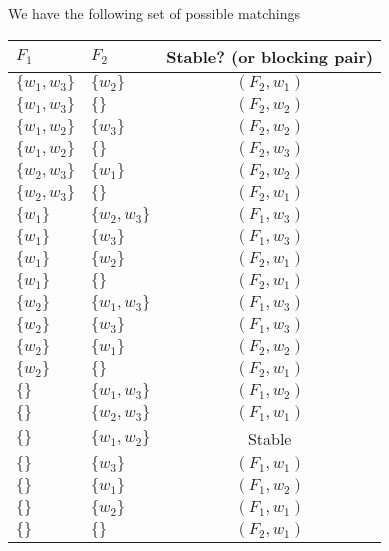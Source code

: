 \documentclass[12pt]{article}
\begin{document}
We have the following set of possible matchings
\begin{center}
\begin{tabular}{l | l || c }
$F_1$ & $F_2$ & Stable? (or blocking pair)\\\hline
$\{w_1, w_3\}$ & $\{w_2\}$ & $(F_2, w_1)$\\
$\{w_1, w_3\}$ & $\{\}$ & $(F_2, w_2)$\\
$\{w_1, w_2\}$ & $\{w_3\}$ & $(F_2, w_2)$\\
$\{w_1, w_2\}$ & $\{\}$ & $(F_2, w_3)$\\
$\{w_2, w_3\}$ & $\{w_1\}$ & $(F_2, w_2)$\\
$\{w_2, w_3\}$ & $\{\}$ & $(F_2, w_1)$\\
$\{w_1\}$ & $\{w_2, w_3\}$ & $(F_1, w_3)$\\
$\{w_1\}$ & $\{w_3\}$ & $(F_1, w_3)$\\
$\{w_1\}$ & $\{w_2\}$ & $(F_2, w_1)$\\
$\{w_1\}$ & $\{\}$ & $(F_2, w_1)$\\
$\{w_2\}$ & $\{w_1, w_3\}$ & $(F_1, w_3)$\\
$\{w_2\}$ & $\{w_3\}$ & $(F_1, w_3)$\\
$\{w_2\}$ & $\{w_1\}$ & $(F_2, w_2)$\\
$\{w_2\}$ & $\{\}$ & $(F_2, w_1)$\\
$\{\}$ & $\{w_1, w_3\}$ & $(F_1, w_2)$\\
$\{\}$ & $\{w_2, w_3\}$ & $(F_1, w_1)$\\
$\{\}$ & $\{w_1, w_2\}$ & Stable\\
$\{\}$ & $\{w_3\}$ & $(F_1, w_1)$\\
$\{\}$ & $\{w_1\}$ & $(F_1, w_2)$\\
$\{\}$ & $\{w_2\}$ & $(F_1, w_1)$\\
$\{\}$ & $\{\}$ & $(F_2, w_1)$
\end{tabular}
\end{center}
\end{document}
